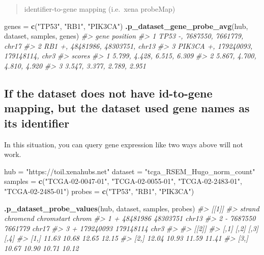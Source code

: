 \documentclass[nofonts,]{tufte-handout}
\newenvironment{Shaded}{\begin{snugshade}}{\end{snugshade}}
\newcommand{\CommentTok}[1]{\textcolor[rgb]{0.56,0.35,0.01}{\textit{#1}}}
\newcommand{\KeywordTok}[1]{\textcolor[rgb]{0.13,0.29,0.53}{\textbf{#1}}}
\newcommand{\NormalTok}[1]{#1}
\newcommand{\StringTok}[1]{\textcolor[rgb]{0.31,0.60,0.02}{#1}}
\begin{document}
\begin{quote}
identifier-to-gene mapping (i.e.~xena probeMap)
\end{quote}

\begin{Shaded}
\begin{Highlighting}[]
\NormalTok{genes =}\StringTok{ }\KeywordTok{c}\NormalTok{(}\StringTok{"TP53"}\NormalTok{, }\StringTok{"RB1"}\NormalTok{, }\StringTok{"PIK3CA"}\NormalTok{)}
\KeywordTok{.p_dataset_gene_probe_avg}\NormalTok{(hub, dataset, samples, }
\NormalTok{    genes)}
\CommentTok{#>     gene                      position}
\CommentTok{#> 1   TP53    -, 7687550, 7661779, chr17}
\CommentTok{#> 2    RB1  +, 48481986, 48303751, chr13}
\CommentTok{#> 3 PIK3CA +, 179240093, 179148114, chr3}
\CommentTok{#>                       scores}
\CommentTok{#> 1 5.799, 4.428, 6.515, 6.309}
\CommentTok{#> 2 5.867, 4.700, 4.810, 4.920}
\CommentTok{#> 3 3.547, 3.377, 2.789, 2.951}
\end{Highlighting}
\end{Shaded}

\hypertarget{if-the-dataset-does-not-have-id-to-gene-mapping-but-the-dataset-used-gene-names-as-its-identifier}{%
\subsection{If the dataset does not have id-to-gene mapping, but the
dataset used gene names as its
identifier}\label{if-the-dataset-does-not-have-id-to-gene-mapping-but-the-dataset-used-gene-names-as-its-identifier}}

In this situation, you can query gene expression like two ways above
will not work.

\begin{Shaded}
\begin{Highlighting}[]
\NormalTok{hub =}\StringTok{ "https://toil.xenahubs.net"}
\NormalTok{dataset =}\StringTok{ "tcga_RSEM_Hugo_norm_count"}
\NormalTok{samples =}\StringTok{ }\KeywordTok{c}\NormalTok{(}\StringTok{"TCGA-02-0047-01"}\NormalTok{, }\StringTok{"TCGA-02-0055-01"}\NormalTok{, }
    \StringTok{"TCGA-02-2483-01"}\NormalTok{, }\StringTok{"TCGA-02-2485-01"}\NormalTok{)}
\NormalTok{probes =}\StringTok{ }\KeywordTok{c}\NormalTok{(}\StringTok{"TP53"}\NormalTok{, }\StringTok{"RB1"}\NormalTok{, }\StringTok{"PIK3CA"}\NormalTok{)}

\KeywordTok{.p_dataset_probe_values}\NormalTok{(hub, dataset, samples, }
\NormalTok{    probes)}
\CommentTok{#> [[1]]}
\CommentTok{#>   strand  chromend chromstart chrom}
\CommentTok{#> 1      +  48481986   48303751 chr13}
\CommentTok{#> 2      -   7687550    7661779 chr17}
\CommentTok{#> 3      + 179240093  179148114  chr3}
\CommentTok{#> }
\CommentTok{#> [[2]]}
\CommentTok{#>       [,1]  [,2]  [,3]  [,4]}
\CommentTok{#> [1,] 11.63 10.68 12.65 12.15}
\CommentTok{#> [2,] 12.04 10.93 11.59 11.41}
\CommentTok{#> [3,] 10.67 10.90 10.71 10.12}
\end{Highlighting}
\end{Shaded}
\end{document}
